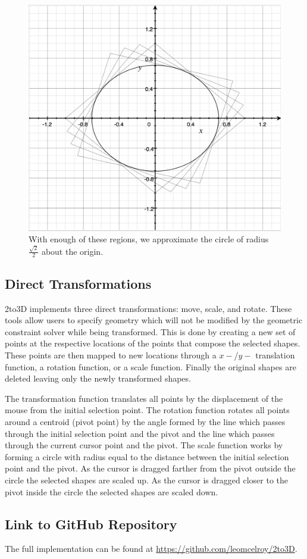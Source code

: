 \begin{figure}[H] 
\includegraphics[width=\linewidth]{dist3.png}
\caption{With enough of these regions, we approximate the circle of radius $\frac{\sqrt{2}}{2}$ about the origin.}
\label{dist3}
\end{figure}

\subsection*{Direct Transformations}

2to3D implements three direct transformations: move, scale, and rotate. These tools allow users to specify geometry which will not be modified by the geometric constraint solver while being transformed. This is done by creating a new set of points at the respective locations of the points that compose the selected shapes. These points are then mapped to new locations through a $x-$/$y-$ translation function, a rotation function, or a scale function. Finally the original shapes are deleted leaving only the newly transformed shapes.

The transformation function translates all points by the displacement of the mouse from the initial selection point. The rotation function rotates all points around a centroid (pivot point) by the angle formed by the line which passes through the initial selection point and the pivot and the line which passes through the current cursor point and the pivot. The scale function works by forming a circle with radius equal to the distance between the initial selection point and the pivot. As the cursor is dragged farther from the pivot outside the circle the selected shapes are scaled up. As the cursor is dragged closer to the pivot inside the circle the selected shapes are scaled down.

\subsection*{Link to GitHub Repository}

The full implementation can be found at \url{https://github.com/leomcelroy/2to3D}.
